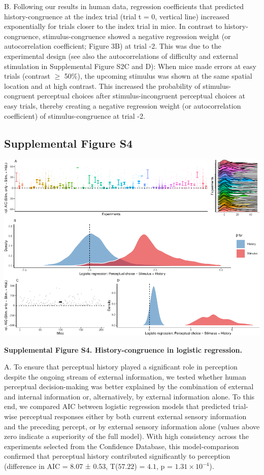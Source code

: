 \documentclass[
]{article}
\begin{document}
B. Following our results in human data, regression coefficients that
predicted history-congruence at the index trial (trial t = 0, vertical
line) increased exponentially for trials closer to the index trial in
mice. In contrast to history-congruence, stimulus-congruence showed a
negative regression weight (or autocorrelation coefficient; Figure 3B)
at trial -2. This was due to the experimental design (see also the
autocorrelations of difficulty and external stimulation in Supplemental
Figure S2C and D): When mice made errors at easy trials (contrast
\(\geq\) 50\%), the upcoming stimulus was shown at the same spatial
location and at high contrast. This increased the probability of
stimulus-congruent perceptual choices after stimulus-incongruent
perceptual choices at easy trials, thereby creating a negative
regression weight (or autocorrelation coefficient) of
stimulus-congruence at trial -2.

\newpage

\hypertarget{supplemental-figure-s4}{%
\subsection{Supplemental Figure S4}\label{supplemental-figure-s4}}

\includegraphics{modes_mouse_rev1b_clean_files/figure-latex/Supplemental_Figure_S4-1.pdf}

\textbf{Supplemental Figure S4. History-congruence in logistic
regression.}

A. To ensure that perceptual history played a significant role in
perception despite the ongoing stream of external information, we tested
whether human perceptual decision-making was better explained by the
combination of external and internal information or, alternatively, by
external information alone. To this end, we compared AIC between
logistic regression models that predicted trial-wise perceptual
responses either by both current external sensory information and the
preceding percept, or by external sensory information alone (values
above zero indicate a superiority of the full model). With high
consistency across the experiments selected from the Confidence
Database, this model-comparison confirmed that perceptual history
contributed significantly to perception (difference in AIC = 8.07 ±
0.53, T(\(57.22\)) = \(4.1\), p = \(\ensuremath{1.31\times 10^{-4}}\)).
\end{document}
